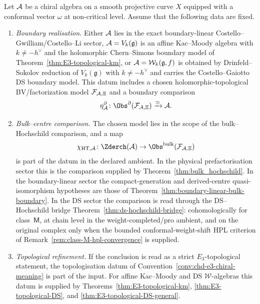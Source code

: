 \begin{theorem}\label{thm:holographic-recon-shadow}
Let $\mathcal{A}$ be a chiral algebra on a smooth projective curve $X$
equipped with a conformal vector $\omega$ at non-critical level.
Assume that the following data are fixed.
\begin{enumerate}[label=\textup{(H\arabic*)}]
\item \emph{Boundary realisation.} Either $\mathcal{A}$ lies in the exact
boundary-linear Costello--Gwilliam/Costello--Li sector,
$\mathcal{A}=V_k(\mathfrak g)$ is an affine Kac--Moody algebra with
$k\neq -h^\vee$ and the holomorphic Chern--Simons boundary model of
Theorem~\ref{thm:E3-topological-km}, or
$\mathcal{A}=\mathcal{W}_k(\mathfrak g,f)$ is obtained by Drinfeld--Sokolov
reduction of $V_k(\mathfrak g)$ with $k\neq -h^\vee$ and carries the
Costello--Gaiotto DS boundary model.  This datum includes a chosen
holomorphic-topological BV/factorization model
\(\mathcal F_{\mathcal{A},\Xi}\) and a boundary comparison
\[
\eta^\partial_\cA\colon
\Obs^\partial(\mathcal F_{\cA,\Xi})\xrightarrow{\simeq}\cA .
\]
\item \emph{Bulk--centre comparison.} The chosen model lies in the
scope of the bulk--Hochschild comparison, and a map
\[
\chi_{\mathrm{HT},\cA}\colon
\Zderch(\cA)\to
\Obs^{\mathrm{bulk}}(\mathcal F_{\cA,\Xi})
\]
is part of the datum in the declared ambient.  In the
physical prefactorisation sector this is the comparison supplied by
Theorem~\ref{thm:bulk_hochschild}. In the boundary-linear sector the
compact-generation and derived-centre quasi-isomorphism hypotheses are
those of Theorem~\ref{thm:boundary-linear-bulk-boundary}. In the DS
sector the comparison is read through the DS--Hochschild bridge
Theorem~\ref{thm:ds-hochschild-bridge}: cohomologically for
class~$\mathsf M$, at chain level in the weight-completed/pro ambient,
and on the original complex only when the bounded conformal-weight-shift
HPL criterion of Remark~\ref{rem:class-M-hpl-convergence} is supplied.
\item \emph{Topological refinement.} If the conclusion is read as a
strict $E_3$-topological statement, the topologisation datum of
Convention~\ref{conv:chd-e3-chiral-meaning} is part of the input. For
affine Kac--Moody and DS $\mathcal W$-algebras this datum is supplied by
Theorems~\ref{thm:E3-topological-km},
\ref{thm:E3-topological-DS}, and
\ref{thm:E3-topological-DS-general}.
\end{enumerate}

\end{theorem}
